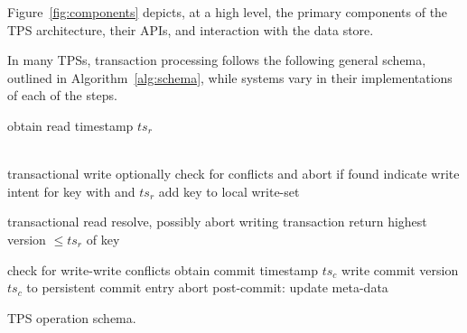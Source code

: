 {Figure~\ref{fig:components} depicts, at a high level, the primary components of the TPS architecture,  
their APIs, and interaction with the data store. 

In many TPSs, transaction processing follows the following general schema, 
outlined in Algorithm~\ref{alg:schema}, while systems vary in their implementations of each of the steps.


\begin{algorithm}[tb]
\begin{algorithmic}[1]
\small
{}
\State obtain read timestamp $ts_r$ 
\EndProcedure

\\ \Comment transactional write
\State optionally check for conflicts and abort if found 
\State indicate write intent for key with  and $ts_r$
\State add key to local write-set
\EndProcedure

 \Comment transactional read
	\State resolve, possibly abort writing transaction \label{l:resolve}
\EndIf
\State return highest version   $\le ts_r$ of key
\EndProcedure


\Statex \Comment check for write-write conflicts  \label{l:validate}
\State obtain commit timestamp $ts_c$
	\State write commit  version $ts_c$ to persistent commit entry \label{l:commit}
\Else
	\State abort	
\EndIf
\State post-commit: update meta-data
\EndProcedure

\end{algorithmic}
\caption{TPS operation schema.} 
\label{alg:schema}

\end{algorithm} 

}
